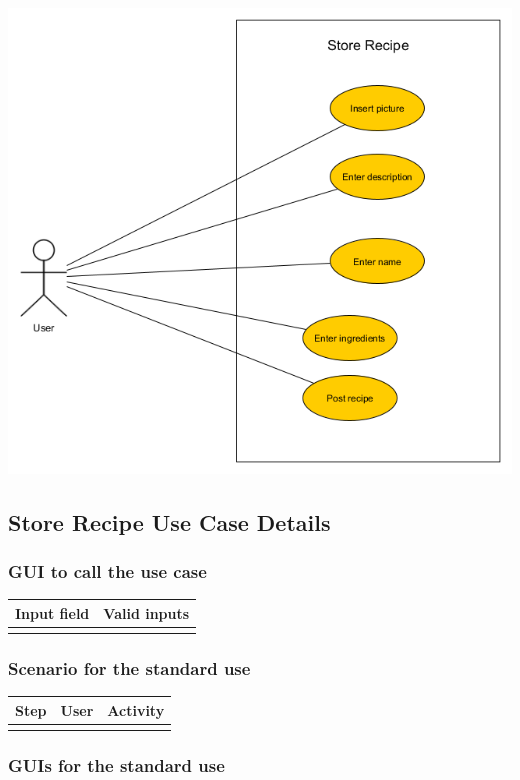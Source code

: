 \documentclass[12pt]{article}
\theoremstyle{definition}
\begin{document}
\includegraphics[scale=.5]{UseCaseStoreRecipe.png}\\

\subsection{Store Recipe Use Case Details}

\subsubsection{GUI to call the use case}

\begin{tabular}{|l|l|}
\hline
Input field & Valid inputs \\ \hline
 &  \\ \hline
\end{tabular}

\subsubsection{Scenario for the standard use}

\begin{tabular}{|l|l|l|}
\hline
Step & User & Activity \\ \hline
 & & \\ \hline
\end{tabular}

\subsubsection{GUIs for the standard use}
\end{document}
